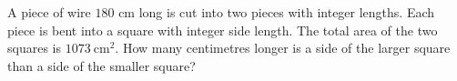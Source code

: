 A piece of wire $180$ cm long is cut into two pieces with integer lengths. Each piece is bent into a square with integer side length. The total area of the two squares is $1073\ \text{cm}^2$. How many centimetres longer is a side of the larger square than a side of the smaller square?
